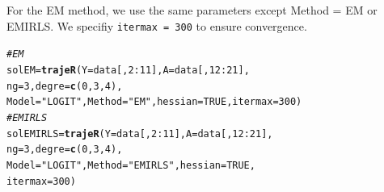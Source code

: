 \documentclass{article}\usepackage[]{graphicx}\usepackage[]{color}
\makeatletter
\newcommand{\hlnum}[1]{\textcolor[rgb]{0.686,0.059,0.569}{#1}}%
\newcommand{\hlstr}[1]{\textcolor[rgb]{0.192,0.494,0.8}{#1}}%
\newcommand{\hlcom}[1]{\textcolor[rgb]{0.678,0.584,0.686}{\textit{#1}}}%
\newcommand{\hlopt}[1]{\textcolor[rgb]{0,0,0}{#1}}%
\newcommand{\hlstd}[1]{\textcolor[rgb]{0.345,0.345,0.345}{#1}}%
\newcommand{\hlkwb}[1]{\textcolor[rgb]{0.69,0.353,0.396}{#1}}%
\newcommand{\hlkwc}[1]{\textcolor[rgb]{0.333,0.667,0.333}{#1}}%
\newcommand{\hlkwd}[1]{\textcolor[rgb]{0.737,0.353,0.396}{\textbf{#1}}}%
\newenvironment{kframe}{%
 \def\at@end@of@kframe{}%
 \ifinner\ifhmode%
  \def\at@end@of@kframe{\end{minipage}}%
  \begin{minipage}{\columnwidth}%
 \fi\fi%
 \def\FrameCommand##1{\hskip\@totalleftmargin \hskip-\fboxsep
 \colorbox{shadecolor}{##1}\hskip-\fboxsep
     \hskip-\linewidth \hskip-\@totalleftmargin \hskip\columnwidth}%
 \MakeFramed {\advance\hsize-\width
   \@totalleftmargin\z@ \linewidth\hsize
   \@setminipage}}%
 {\par\unskip\endMakeFramed%
 \at@end@of@kframe}
\newenvironment{knitrout}{}{} %
\makeatother
\begin{document}
For the EM method, we use the same parameters except Method = EM or EMIRLS. We specifiy \verb|itermax = 300| to ensure convergence.
\begin{knitrout}
\color{fgcolor}\begin{kframe}
\begin{alltt}
\hlcom{#EM}
\hlstd{solEM} \hlkwb{=} \hlkwd{trajeR}\hlstd{(}\hlkwc{Y} \hlstd{= data[,}\hlnum{2}\hlopt{:}\hlnum{11}\hlstd{],} \hlkwc{A} \hlstd{= data[,}\hlnum{12}\hlopt{:}\hlnum{21}\hlstd{],}
               \hlkwc{ng} \hlstd{=} \hlnum{3}\hlstd{,} \hlkwc{degre} \hlstd{=} \hlkwd{c}\hlstd{(}\hlnum{0}\hlstd{,}\hlnum{3}\hlstd{,}\hlnum{4}\hlstd{),}
               \hlkwc{Model} \hlstd{=} \hlstr{"LOGIT"}\hlstd{,} \hlkwc{Method} \hlstd{=} \hlstr{"EM"}\hlstd{,} \hlkwc{hessian} \hlstd{=} \hlnum{TRUE}\hlstd{,} \hlkwc{itermax} \hlstd{=} \hlnum{300}\hlstd{)}
\hlcom{#EMIRLS}
\hlstd{solEMIRLS} \hlkwb{=} \hlkwd{trajeR}\hlstd{(}\hlkwc{Y} \hlstd{= data[,}\hlnum{2}\hlopt{:}\hlnum{11}\hlstd{],} \hlkwc{A} \hlstd{= data[,}\hlnum{12}\hlopt{:}\hlnum{21}\hlstd{],}
                    \hlkwc{ng} \hlstd{=} \hlnum{3}\hlstd{,} \hlkwc{degre}\hlstd{=}\hlkwd{c}\hlstd{(}\hlnum{0}\hlstd{,}\hlnum{3}\hlstd{,}\hlnum{4}\hlstd{),}
                    \hlkwc{Model} \hlstd{=} \hlstr{"LOGIT"}\hlstd{,} \hlkwc{Method} \hlstd{=} \hlstr{"EMIRLS"}\hlstd{,} \hlkwc{hessian} \hlstd{=} \hlnum{TRUE}\hlstd{,}
                    \hlkwc{itermax} \hlstd{=} \hlnum{300}\hlstd{)}
\end{alltt}
\end{kframe}
\end{knitrout}
\end{document}
